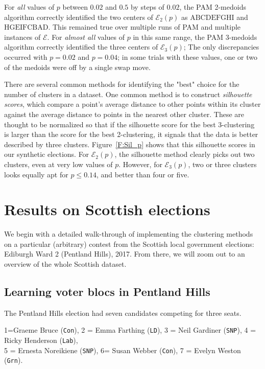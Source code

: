 \documentclass{amsart}
\newcommand{\E}{\mathcal{E}}
\newcommand{\Con}{{\tt Con}\xspace}
\newcommand{\LD}{{\tt LD}\xspace}
\newcommand{\SNP}{{\tt SNP}\xspace}
\newcommand{\Lab}{{\tt Lab}\xspace}
\newcommand{\Grn}{{\tt Grn}\xspace}
\theoremstyle{plain}
\theoremstyle{definition}
\theoremstyle{remark}
\begin{document}
For \emph{all} values of $p$ between $0.02$ and $0.5$ by steps of $0.02$, the PAM 2-medoids algorithm correctly identified the two centers of $\E_2(p)$ as $\text{ABCDEFGHI}$ and $\text{HGEIFCBAD}$.  This remained true over multiple runs of PAM and multiple instances of $\E$.
For \emph{almost all} values of $p$ in this same range, the PAM 3-medoids algorithm correctly identified the three centers of $\E_3(p)$; The only discrepancies occurred with $p=0.02$ and $p=0.04$; in some trials with these values, one or two of the medoids were off by a single swap move. 



There are several common methods for identifying the "best" choice for the number of clusters in a dataset.
One common method is to construct {\em silhouette scores}, which compare a point's average distance to other points within its cluster against the average distance to points in the nearest other cluster.
These are thought to be normalized so that if the silhouette score for  the best 3-clustering is larger than the score for the best 2-clustering, it signals that the data is better described by three clusters.
Figure~\ref{F:Sil_p} shows that this silhouette scores in our synthetic elections.   
For $\E_2(p)$, the silhouette method clearly picks out two clusters, even at very low values of $p$.  However,  for $\E_3(p)$, two or three clusters looks equally apt for $p\leq 0.14$, and better than four or five.
 
\clearpage
\section{Results on Scottish elections}

We begin with a detailed walk-through of implementing the clustering methods on a particular (arbitrary) contest from the Scottish local government elections:  
Ediburgh Ward 2 (Pentland Hills), 2017. From there, we will zoom out to an overview of the whole Scottish dataset.

\subsection{Learning voter blocs in Pentland Hills}

The Pentland Hills election had seven candidates competing for three seats.

\begin{center}
{\small 1=Graeme Bruce (\Con), 2 = Emma Farthing (\LD), 3 = Neil Gardiner (\SNP), 4 = Ricky Henderson (\Lab),\\ 5 = Ernesta Noreikiene (\SNP), 6= Susan Webber (\Con), 7 = Evelyn Weston (\Grn).  }
\end{center}
\end{document}
